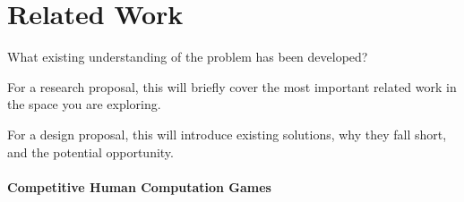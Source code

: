 
\section{Related Work}

What existing understanding of the problem has been developed?

For a research proposal, this will briefly cover the most important related work in the space you are exploring.

For a design proposal, this will introduce existing solutions, why they fall short, and the potential opportunity.

\paragraph{Competitive Human Computation Games}